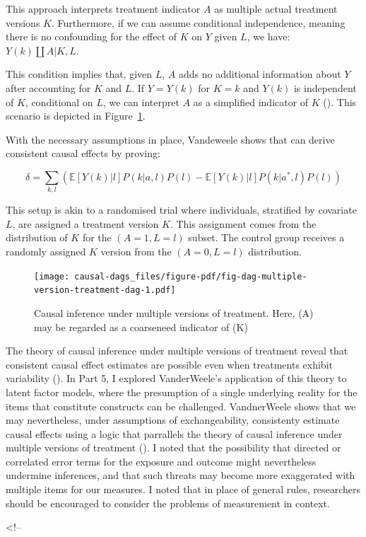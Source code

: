 \documentclass[
  singlecolumn,
  9pt]{article}
\begin{document}
This approach interprets treatment indicator \(A\) as multiple actual
treatment versions \(K\). Furthermore, if we can assume conditional
independence, meaning there is no confounding for the effect of \(K\) on
\(Y\) given \(L\), we have: \(Y(k)\coprod A|K,L\).

This condition implies that, given \(L\), \(A\) adds no additional
information about \(Y\) after accounting for \(K\) and \(L\). If
\(Y = Y(k)\) for \(K = k\) and \(Y(k)\) is independent of \(K\),
conditional on \(L\), we can interpret \(A\) as a simplified indicator
of \(K\) ().
This scenario is depicted in
Figure~\ref{fig-dag-multiple-version-treatment-dag}.

With the necessary assumptions in place, Vandeweele shows that can
derive consistent causal effects by proving:

\[\delta = \sum_{k,l} \left( \mathbb{E}[Y(k)|l] P(k|a,l) P(l) - \mathbb{E}[Y(k)|l] P(k|a^*,l) P(l) \right) \]

This setup is akin to a randomised trial where individuals, stratified
by covariate \(L\), are assigned a treatment version \(K\). This
assignment comes from the distribution of \(K\) for the
\((A = 1, L = l)\) subset. The control group receives a randomly
assigned \(K\) version from the \((A = 0, L = l)\) distribution.

\begin{figure}

{\centering \texttt{[image: causal-dags\_files/figure-pdf/fig-dag-multiple-version-treatment-dag-1.pdf]}

}

\caption{\label{fig-dag-multiple-version-treatment-dag}Causal inference
under multiple versions of treatment. Here, (A) may be regarded as a
coarseneed indicator of (K)}

\end{figure}

The theory of causal inference under multiple versions of treatment
reveal that consistent causal effect estimates are possible even when
treatments exhibit variability
(). In Part
5, I explored VanderWeele's application of this theory to latent factor
models, where the presumption of a single underlying reality for the
items that constitute constructs can be challenged. VandnerWeele shows
that we may nevertheless, under assumptions of exchangeability,
consistenty estimate causal effects using a logic that parrallels the
theory of causal inference under multiple versions of treatment
(). I noted that the
possibility that directed or correlated error terms for the exposure and
outcome might nevertheless undermine inferences, and that such threats
may become more exaggerated with multiple items for our measures. I
noted that in place of general rules, researchers should be encouraged
to consider the problems of measurement in context.

\textless!--
\end{document}

